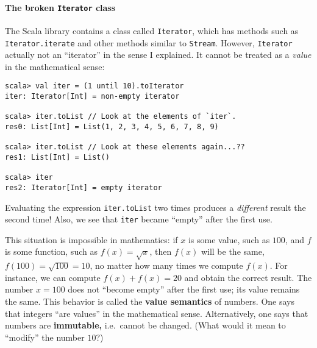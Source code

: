\paragraph{The broken \texttt{Iterator} class}

The Scala library contains a class called \lstinline!Iterator!,
which has methods such as \lstinline!Iterator.iterate!
and other methods similar to \lstinline!Stream!.
However, \lstinline!Iterator!
actually not an ``iterator'' in the sense I explained. It cannot
be treated as a \emph{value} in the mathematical sense:
\begin{lstlisting}
scala> val iter = (1 until 10).toIterator
iter: Iterator[Int] = non-empty iterator

scala> iter.toList // Look at the elements of `iter`.
res0: List[Int] = List(1, 2, 3, 4, 5, 6, 7, 8, 9)

scala> iter.toList // Look at these elements again...??
res1: List[Int] = List()

scala> iter
res2: Iterator[Int] = empty iterator
\end{lstlisting}
Evaluating the expression \lstinline!iter.toList!
two times produces a \emph{different} result the second time! Also,
we see that \lstinline!iter!
became ``empty'' after the first use.

This situation is impossible in mathematics: if $x$ is some value,
such as $100$, and $f$ is some function, such as $f(x)=\sqrt{x}$,
then $f(x)$ will be the same, $f(100)=\sqrt{100}=10$, no matter
how many times we compute $f(x)$. For instance, we can compute $f(x)+f(x)=20$
and obtain the correct result. The number $x=100$ does not ``become
empty'' after the first use; its value remains the same. This behavior
is called the \textbf{value semantics} of
numbers. One says that integers ``are values'' in the mathematical
sense. Alternatively, one says that numbers are \textbf{immutable,}
i.e.~cannot be changed. (What would it mean to ``modify'' the number
$10$?)

